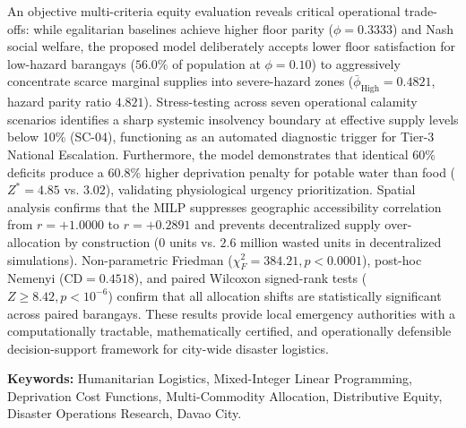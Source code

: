 An objective multi-criteria equity evaluation reveals critical operational trade-offs: while egalitarian baselines achieve higher floor parity ($\phi = 0.3333$) and Nash social welfare, the proposed model deliberately accepts lower floor satisfaction for low-hazard barangays ($56.0\%$ of population at $\phi = 0.10$) to aggressively concentrate scarce marginal supplies into severe-hazard zones ($\bar{\phi}_{\text{High}} = 0.4821$, hazard parity ratio $4.821$). Stress-testing across seven operational calamity scenarios identifies a sharp systemic insolvency boundary at effective supply levels below 10\% (SC-04), functioning as an automated diagnostic trigger for Tier-3 National Escalation. Furthermore, the model demonstrates that identical 60\% deficits produce a 60.8\% higher deprivation penalty for potable water than food ($Z^* = 4.85$ vs. $3.02$), validating physiological urgency prioritization. Spatial analysis confirms that the MILP suppresses geographic accessibility correlation from $r = +1.0000$ to $r = +0.2891$ and prevents decentralized supply over-allocation by construction ($0$ units vs. $2.6$ million wasted units in decentralized simulations). Non-parametric Friedman ($\chi_F^2 = 384.21, p < 0.0001$), post-hoc Nemenyi ($\text{CD} = 0.4518$), and paired Wilcoxon signed-rank tests ($Z \ge 8.42, p < 10^{-6}$) confirm that all allocation shifts are statistically significant across paired barangays. These results provide local emergency authorities with a computationally tractable, mathematically certified, and operationally defensible decision-support framework for city-wide disaster logistics.

\vspace{1.5em}
\noindent\textbf{Keywords:} Humanitarian Logistics, Mixed-Integer Linear Programming, Deprivation Cost Functions, Multi-Commodity Allocation, Distributive Equity, Disaster Operations Research, Davao City.

